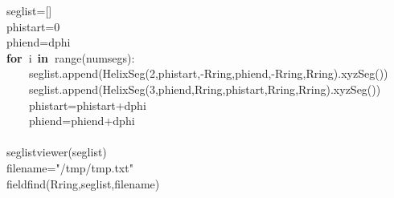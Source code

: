 \documentclass{article}
\newcommand{\hlstd}[1]{\textcolor[rgb]{0,0,0}{#1}}
\newcommand{\hlnum}[1]{\textcolor[rgb]{0.16,0.16,1}{#1}}
\newcommand{\hlstr}[1]{\textcolor[rgb]{1,0,0}{#1}}
\newcommand{\hlsym}[1]{\textcolor[rgb]{0,0,0}{#1}}
\newcommand{\hlkwa}[1]{\textcolor[rgb]{0,0,0}{\bf{#1}}}
\newcommand{\hlkwb}[1]{\textcolor[rgb]{0.51,0,0}{#1}}
\newcommand{\hlkwd}[1]{\textcolor[rgb]{0,0,0.51}{#1}}
\begin{document}
\hlstd{}\hlstd{\ \ \ \ }\hlstd{seglist}\hlsym{={[}{]}}\hspace*{\fill}\\
\hlstd{}\hlstd{\ \ \ \ }\hlstd{phistart}\hlsym{=}\hlstd{}\hlnum{0}\hspace*{\fill}\\
\hlstd{}\hlstd{\ \ \ \ }\hlstd{phiend}\hlsym{=}\hlstd{dphi\hspace*{\fill}\\
}\hlstd{\ \ \ \ }\hlstd{}\hlkwa{for\ }\hlstd{i\ }\hlkwa{in\ }\hlstd{}\hlkwb{range}\hlstd{}\hlsym{(}\hlstd{numsegs}\hlsym{):}\hspace*{\fill}\\
\hlstd{}\hlstd{\ \ \ \ \ \ \ \ }\hlstd{seglist}\hlsym{.}\hlstd{}\hlkwd{append}\hlstd{}\hlsym{(}\hlstd{}\hlkwd{HelixSeg}\hlstd{}\hlsym{(}\hlstd{}\hlnum{2}\hlstd{}\hlsym{,}\hlstd{phistart}\hlsym{,{-}}\hlstd{Rring}\hlsym{,}\hlstd{phiend}\hlsym{,{-}}\hlstd{Rring}\hlsym{,}\hlstd{Rring}\hlsym{).}\hlstd{}\hlkwd{xyzSeg}\hlstd{}\hlsym{())}\hspace*{\fill}\\
\hlstd{}\hlstd{\ \ \ \ \ \ \ \ }\hlstd{seglist}\hlsym{.}\hlstd{}\hlkwd{append}\hlstd{}\hlsym{(}\hlstd{}\hlkwd{HelixSeg}\hlstd{}\hlsym{(}\hlstd{}\hlnum{3}\hlstd{}\hlsym{,}\hlstd{phiend}\hlsym{,}\hlstd{Rring}\hlsym{,}\hlstd{phistart}\hlsym{,}\hlstd{Rring}\hlsym{,}\hlstd{Rring}\hlsym{).}\hlstd{}\hlkwd{xyzSeg}\hlstd{}\hlsym{())}\hspace*{\fill}\\
\hlstd{}\hlstd{\ \ \ \ \ \ \ \ }\hlstd{phistart}\hlsym{=}\hlstd{phistart}\hlsym{+}\hlstd{dphi\hspace*{\fill}\\
}\hlstd{\ \ \ \ \ \ \ \ }\hlstd{phiend}\hlsym{=}\hlstd{phiend}\hlsym{+}\hlstd{dphi\hspace*{\fill}\\
\hspace*{\fill}\\
}\hlstd{\ \ \ \ }\hlstd{}\hlkwd{seglistviewer}\hlstd{}\hlsym{(}\hlstd{seglist}\hlsym{)}\hspace*{\fill}\\
\hlstd{}\hlstd{\ \ \ \ }\hlstd{filename}\hlsym{=}\hlstd{}\hlstr{"/tmp/tmp.txt"}\hlstd{\hspace*{\fill}\\
}\hlstd{\ \ \ \ }\hlstd{}\hlkwd{fieldfind}\hlstd{}\hlsym{(}\hlstd{Rring}\hlsym{,}\hlstd{seglist}\hlsym{,}\hlstd{filename}\hlsym{)}\hspace*{\fill}\\
\end{document}
